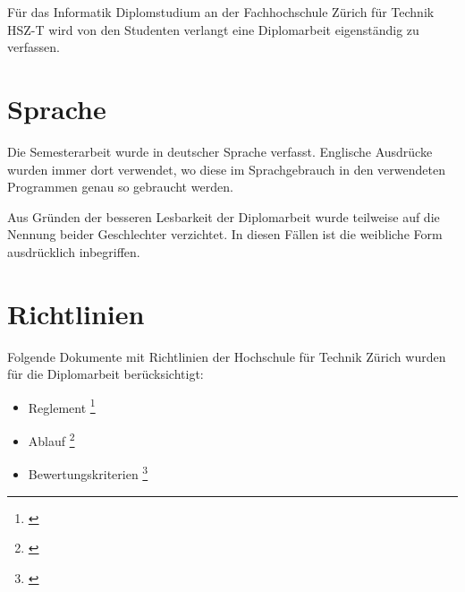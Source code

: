 Für das Informatik Diplomstudium an der Fachhochschule Zürich für Technik
HSZ-T wird von den Studenten verlangt eine Diplomarbeit eigenständig zu
verfassen.

\section{Sprache}
Die Semesterarbeit wurde in deutscher Sprache verfasst. Englische Ausdrücke 
wurden immer dort verwendet, wo diese im Sprachgebrauch in den verwendeten 
Programmen genau so gebraucht werden.

Aus Gründen der besseren Lesbarkeit der Diplomarbeit wurde teilweise auf 
die Nennung beider Geschlechter verzichtet. In diesen Fällen ist die 
weibliche Form ausdrücklich inbegriffen.
  
\section{Richtlinien}
Folgende Dokumente mit Richtlinien der Hochschule für Technik Zürich 
wurden für die Diplomarbeit berücksichtigt:

\begin{itemize}
    \item Reglement \footnote{\citealp*[Vgl.][ganzes Dokument]{hsz_reglement}}
    \item Ablauf \footnote{\citealp*[Vgl.][ganzes Dokument]{hsz_ablauf}}
    \item Bewertungskriterien \footnote{\citealp*[Vgl.][ganzes Dokument]{hsz_bewertungskriterien}}
\end{itemize}
